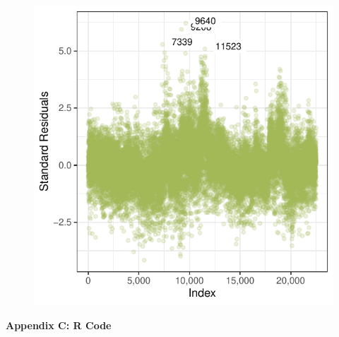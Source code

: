 \documentclass[11pt]{article}\usepackage[]{graphicx}\usepackage[]{color}
\makeatletter
\def\maxwidth{ %
  \ifdim\Gin@nat@width>\linewidth
    \linewidth
  \else
    \Gin@nat@width
  \fi
}
\makeatother
\begin{document}
\begin{figure}[h!] 
\begin{center}

\includegraphics[width=\maxwidth]{figure/unnamed-chunk-10-1} 

\caption{}
\label{diag3}
\end{center} 
\end{figure}


\clearpage
\newpage
\noindent \Large{{\bf Appendix C: R Code}}

\end{document}

